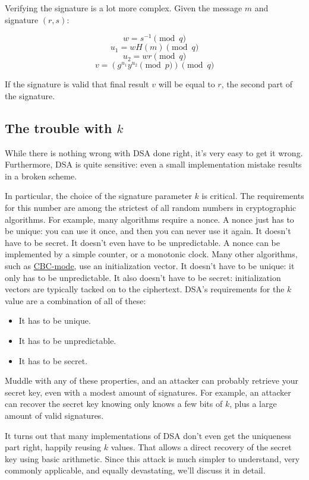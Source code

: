 \documentclass[11pt,ebook,table,dvipsnames]{memoir}
\begin{document}
Verifying the signature is a lot more complex. Given the message $m$
and signature $(r, s)$:

\[
w = s^{-1} \pmod q
\]
\[
u_1 = wH(m) \pmod q
\]
\[
u_2 = wr \pmod q
\]
\[
v = (g^{u_1}y^{u_2} \pmod p) \pmod q
\]

If the signature is valid that final result $v$ will be equal to $r$,
the second part of the signature.
\subsection{The trouble with $k$}
\label{sec-2-8-3-4}

While there is nothing wrong with DSA done right, it's very easy to
get it wrong. Furthermore, DSA is quite sensitive: even a small
implementation mistake results in a broken scheme.

In particular, the choice of the signature parameter $k$ is critical.
The requirements for this number are among the strictest of all random
numbers in cryptographic algorithms. For example, many algorithms
require a \gls{nonce}. A nonce just has to be unique: you can use it
once, and then you can never use it again. It doesn't have to be
secret. It doesn't even have to be unpredictable. A nonce can be
implemented by a simple counter, or a monotonic clock. Many other
algorithms, such as \hyperref[CBC mode]{CBC-mode}, use an initialization vector. It doesn't
have to be unique: it only has to be unpredictable. It also doesn't
have to be secret: initialization vectors are typically tacked on to
the ciphertext. DSA's requirements for the $k$ value are a combination
of all of these:

\begin{itemize}
\item It has to be unique.
\item It has to be unpredictable.
\item It has to be secret.
\end{itemize}

Muddle with any of these properties, and an attacker can probably
retrieve your secret key, even with a modest amount of signatures. For
example, an attacker can recover the secret key knowing only knows a
few bits of $k$, plus a large amount of valid signatures.
\cite{nguyen:dsa}

It turns out that many implementations of DSA don't even get the
uniqueness part right, happily reusing $k$ values. That allows a
direct recovery of the secret key using basic arithmetic. Since this
attack is much simpler to understand, very commonly applicable, and
equally devastating, we'll discuss it in detail.
\end{document}
